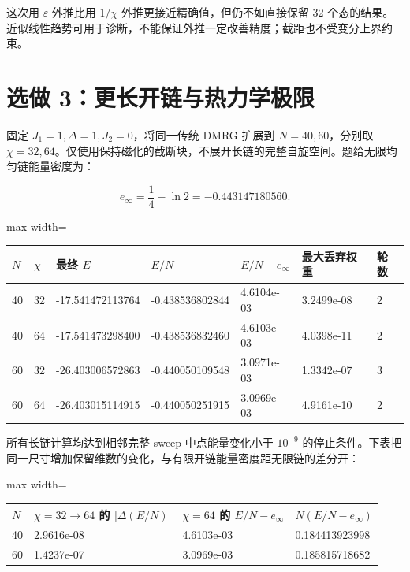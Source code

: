\documentclass[zihao=5,a4paper]{ctexart}
\begin{document}
这次用 $\varepsilon$ 外推比用 $1/\chi$ 外推更接近精确值，但仍不如直接保留 32 个态的结果。近似线性趋势可用于诊断，不能保证外推一定改善精度；截距也不受变分上界约束。


\section{选做 3：更长开链与热力学极限}

固定 $J_1=1,\Delta=1,J_2=0$，将同一传统 DMRG 扩展到 $N=40,60$，分别取 $\chi=32,64$。仅使用保持磁化的截断块，不展开长链的完整自旋空间。题给无限均匀链能量密度为：


\[
e_\infty=\frac14-\ln2=-0.443147180560.
\]

\begin{center}
\small
\begin{adjustbox}{max width=\linewidth}
\begin{tabular}{lllllll}
\toprule
$N$ & $\chi$ & 最终 $E$ & $E/N$ & $E/N-e_\infty$ & 最大丢弃权重 & 轮数 \\
\midrule
40 & 32 & -17.541472113764 & -0.438536802844 & 4.6104e-03 & 3.2499e-08 & 2 \\
40 & 64 & -17.541473298400 & -0.438536832460 & 4.6103e-03 & 4.0398e-11 & 2 \\
60 & 32 & -26.403006572863 & -0.440050109548 & 3.0971e-03 & 1.3342e-07 & 3 \\
60 & 64 & -26.403015114915 & -0.440050251915 & 3.0969e-03 & 4.9161e-10 & 2 \\
\bottomrule
\end{tabular}
\end{adjustbox}
\end{center}

所有长链计算均达到相邻完整 sweep 中点能量变化小于 $10^{-9}$ 的停止条件。下表把同一尺寸增加保留维数的变化，与有限开链能量密度距无限链的差分开：


\begin{center}
\small
\begin{adjustbox}{max width=\linewidth}
\begin{tabular}{llll}
\toprule
$N$ & $\chi=32\to64$ 的 $|\Delta(E/N)|$ & $\chi=64$ 的 $E/N-e_\infty$ & $N(E/N-e_\infty)$ \\
\midrule
40 & 2.9616e-08 & 4.6103e-03 & 0.184413923998 \\
60 & 1.4237e-07 & 3.0969e-03 & 0.185815718682 \\
\bottomrule
\end{tabular}
\end{adjustbox}
\end{center}
\end{document}

